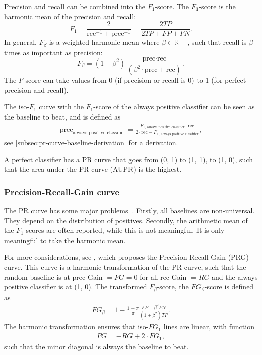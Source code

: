 Precision and recall can be combined into the $F_1$-score.
The $F_1$-score is the harmonic mean of the precision and recall:
\begin{equation}
    F_1 = \frac{2}{\text{rec}^{-1} + \text{prec}^{-1}} = \frac{2 TP}{2 TP + FP + FN}.
\end{equation}
In general, $F_\beta$ is a weighted harmonic mean where $\beta\in\mathbb{R}+$, such that recall is $\beta$ times as important as precision:
\begin{equation}
    F_\beta = (1+\beta^2)\frac{\text{prec}\cdot\text{rec}}{(\beta^2\cdot\text{prec}+\text{rec})}.
\end{equation} 
The $F$-score can take values from 0 (if precision or recall is 0) to 1 (for perfect precision and recall).

The iso-$F_1$ curve with the $F_1$-score of the always positive classifier can be seen as the baseline to beat, and is defined as
\begin{align}
    \mathrm{prec}_\text{always positive classifier} = \frac{F_{1,\,\text{always positive classifier}} \cdot \mathrm{rec}}{2\cdot\mathrm{rec} - F_{1,\,\text{always positive classifier}}},
\end{align}
see \cref{subsec:pr-curve-baseline-derivation} for a derivation.

A perfect classifier has a PR curve that goes from (0, 1) to (1, 1), to (1, 0), such that the area under the PR curve (AUPR) is the highest.

\subsubsection{Precision-Recall-Gain curve}
The PR curve has some major problems~.
Firstly, all baselines are non-universal.
They depend on the distribution of positives.
Secondly, the arithmetic mean of the $F_1$ scores are often reported, while this is not meaningful.
It is only meaningful to take the harmonic mean.

For more considerations, see \textcite{Flach2015}, which proposes the Precision-Recall-Gain (PRG) curve.
This curve is a harmonic transformation of the PR curve, such that the random baseline is at $\mathrm{prec}$-Gain $ = PG = 0$ for all $\mathrm{rec}$-Gain $ = RG$ and the always positive classifier is at (1, 0).
The transformed $F_\beta$-score, the $FG_\beta$-score is defined as
\begin{align}
    FG_\beta = 1 - \frac{1 - \pi}{\pi}\frac{FP + \beta^2 FN}{(1+\beta^2)TP}.
\end{align}
The harmonic transformation ensures that iso-$FG_1$ lines are linear, with function
\begin{align}
    PG = -RG + 2 \cdot FG_1,
\end{align}
such that the minor diagonal is always the baseline to beat.

